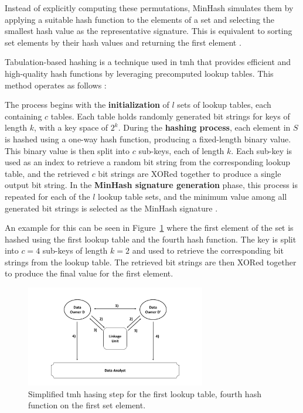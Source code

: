 Instead of explicitly computing these permutations, MinHash simulates them by applying a suitable hash function to the elements of a set and selecting the smallest hash value as the representative signature.
This is equivalent to sorting set elements by their hash values and returning the first element \cite{schaefer2024}.

Tabulation-based hashing is a technique used in \ac{tmh} that provides efficient and high-quality hash functions by leveraging precomputed lookup tables.
This method operates as follows \cite{vidanage2020graph}:

The process begins with the \textbf{initialization} of \(l\) sets of lookup tables, each containing \(c\) tables.
Each table holds randomly generated bit strings for keys of length \(k\), with a key space of \(2^k\).
During the \textbf{hashing process}, each element in \(S\) is hashed using a one-way hash function, producing a fixed-length binary value.
This binary value is then split into \(c\) sub-keys, each of length \(k\).
Each sub-key is used as an index to retrieve a random bit string from the corresponding lookup table, and the retrieved \(c\) bit strings are XORed together to produce a single output bit string.
In the \textbf{MinHash signature generation} phase, this process is repeated for each of the \(l\) lookup table sets, and the minimum value among all generated bit strings is selected as the MinHash signature \cite{schaefer2024,vidanage2020graph}.

An example for this can be seen in Figure~\ref{fig:tabminhashexample} where the first element of the set is hashed using the first lookup table and the fourth hash function.
The key is split into \(c = 4\) sub-keys of length \(k = 2\) and used to retrieve the corresponding bit strings from the lookup table.
The retrieved bit strings are then XORed together to produce the final value for the first element.

\begin{figure}[H]
  \centering
  \includegraphics[width=0.7\textwidth, page=7]{img/visualization.pdf}
  \caption{Simplified \ac{tmh} hasing step for the first lookup table, fourth hash function on the first set element.}
  \label{fig:tabminhashexample}
\end{figure}


